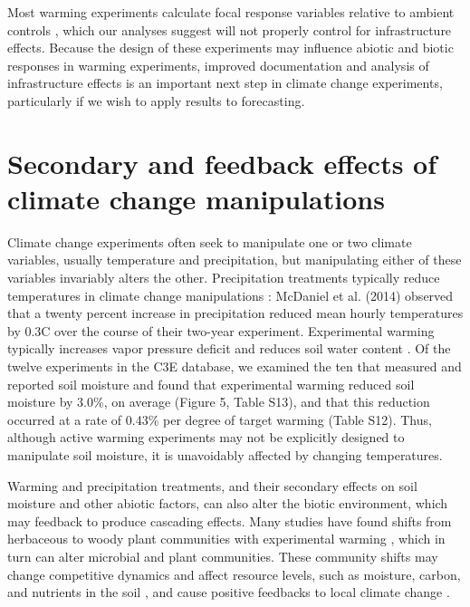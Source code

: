 \documentclass{article}
\begin{document}
\par Most warming experiments calculate focal response variables relative to ambient controls \citep [e.g.,][]{marchin2015}, which our analyses suggest will not properly control for infrastructure effects. Because the design of these experiments may influence abiotic and biotic responses in warming experiments, improved documentation and analysis of infrastructure effects is an important next step in climate change experiments, particularly if we wish to apply results to forecasting.

\section* {Secondary and feedback effects of climate change manipulations} 
Climate change experiments often seek to manipulate one or two climate variables, usually temperature and precipitation, but manipulating either of these variables invariably alters the other. Precipitation treatments typically reduce temperatures in climate change manipulations \citep{sherry2007,rollinson2012,mcdaniel2014}: McDaniel et al. (2014) observed that a twenty percent increase in precipitation reduced mean hourly temperatures by 0.3\degree C over the course of their two-year experiment. Experimental warming typically increases vapor pressure deficit and reduces soil water content \citep[e.g.,][]{sherry2007,morin2010,pelini2014,templer2016}. Of the twelve experiments in the C3E database, we examined the ten that measured and reported soil moisture and found that experimental warming reduced soil moisture by 3.0\%, on average (Figure 5, Table S13), and that this reduction occurred at a rate of 0.43\% per degree of target warming (Table S12). Thus, although active warming experiments may not be explicitly designed to manipulate soil moisture, it is unavoidably affected by changing temperatures. 

\par Warming and precipitation treatments, and their secondary effects on soil moisture and other abiotic factors, can also alter the biotic environment, which may feedback to produce cascading effects. Many studies have found shifts from herbaceous to woody plant communities with experimental warming \citep[secondary effects][]{rollinson2012, mcdaniel2014,mcdaniel2014b, harte2015}, which in turn can alter microbial and plant communities. These community shifts may change competitive dynamics and affect resource levels, such as moisture, carbon, and nutrients in the soil \citep{mcdaniel2014,mcdaniel2014b, harte2015}, and cause positive feedbacks to local climate change \citep{harte2015}. 
\end{document}
